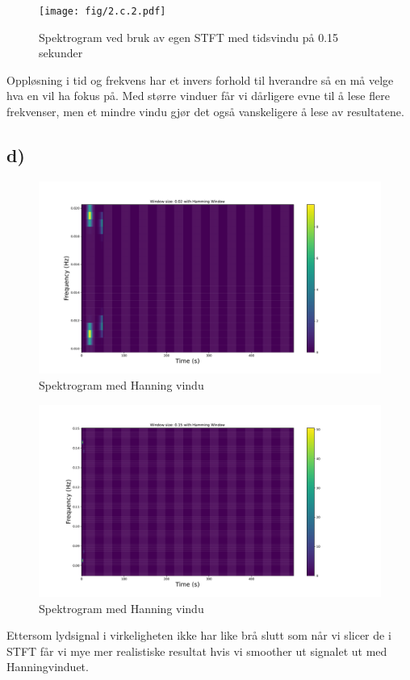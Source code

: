 \documentclass{article}
\begin{document}
\begin{figure}[h!]
  \centering
  \texttt{[image: fig/2.c.2.pdf]}
  \caption{Spektrogram ved bruk av egen STFT med tidsvindu på 0.15 sekunder}
  \label{fig: 2.c.2}
\end{figure}
Oppløsning i tid og frekvens har et invers forhold til hverandre så en må velge hva en vil ha fokus på. Med større vinduer får vi dårligere evne til å lese flere frekvenser, men et mindre vindu gjør det også vanskeligere å lese av resultatene.  %


\subsection*{d)}
\begin{figure}[h!]
  \centering
  \includegraphics[width = \textwidth]{fig/2.d.1.pdf}
  \caption{Spektrogram med Hanning vindu}
  \label{fig: 2.d.1}
\end{figure}

\begin{figure}[h!]
  \centering
  \includegraphics[width = \textwidth]{fig/2.d.2.pdf}
  \caption{Spektrogram med Hanning vindu}
  \label{fig: }
\end{figure}
Ettersom lydsignal i virkeligheten ikke har like brå slutt som når vi slicer de i STFT får vi mye mer realistiske resultat hvis vi smoother ut signalet ut med Hanningvinduet. 
\end{document}

